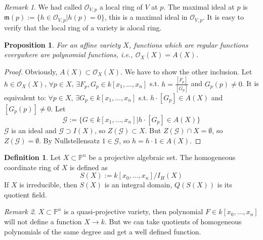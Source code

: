 \documentclass{amsart}
\theoremstyle{plain}
\newtheorem{proposition}{Proposition}
\theoremstyle{definition}
\newtheorem{definition}{Definition}
\theoremstyle{remark}
\newtheorem*{remark}{Remark}
\numberwithin{equation}{section}
\begin{document}
 \begin{remark}
 	We had called $ \mathcal{O}_{V,p} $ a local ring of $ V $ at $ p $. The maximal ideal at $ p $ is $ \mathfrak{m}(p):=\{ h\in \mathcal{O}_{V,p}|h(p)=0 \} $, this is a maximal ideal in $ \mathcal{O}_{V,p} $. It is easy to verify that the local ring of a variety is alocal ring.
 \end{remark}
 \begin{proposition}\label{10}
 	For an affine variety $ X $, functions which are regular functions everywhere are polynomial functions, i.e., $ \mathcal{O}_X(X)=A(X) $.
 \end{proposition}
 \begin{proof}
 	Obviously, $ A(X)\subset \mathcal{O}_X(X) $. We have to show the other inclusion. Let $ h\in \mathcal{O}_X(X) $, $ \forall p\in X $, $ \exists F_p,G_p\in k[x_1,\dots,x_n] $ s.t.
 	$ h=\frac{[F_p]}{[G_p]} $ and $ G_p(p)\neq 0 $. It is equivalent to: $ \forall p\in X $, $ \exists G_p\in k[x_1,\dots,x_n] $ s.t. $ h\cdot [G_p] \in A(X)$ and $ [G_p(p)]\neq 0 $. Let
 	\begin{equation}
 	\mathcal{G}:=\{ G\in k[x_1,\dots,x_n]|h\cdot [G_p]\in A(X) \}
 	\end{equation}
 	$ \mathcal{G} $ is an ideal and $ \mathcal{G}\supset I(X) $, so $ Z(\mathcal{G})\subset X $. But $ Z(\mathcal{G})\cap X=\emptyset $, so $ Z(\mathcal{G})=\emptyset $. By Nullstellensatz $ 1\in\mathcal{G} $, so $ h=h\cdot 1\in A(X) $.
 \end{proof}
 
 \begin{definition}
 	Let $ X\subset\mathbb{P}^n $ be a projective algebraic set. The homogeneous coordinate ring of $ X $ is defined as
 	\begin{equation}
 	S(X):=k[x_0,\dots,x_n]/I_H(X)
 	\end{equation}
 	If $ X $ is irreducible, then $ S(X) $ is an integral domain, $ Q(S(X)) $ is its quotient field.
 \end{definition}
 \begin{remark}
 	$ X\subset \mathbb{P}^n$ is a quasi-projective variety, then polynomial $ F\in k[x_0,\dots,x_n] $ will not define a function $ X\to k $. But we can take quotients of homogeneous polynomials of the same degree and get a well defined function.
 \end{remark}
\end{document}
